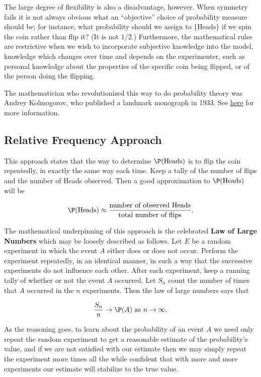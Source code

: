 \documentclass[captions=tableheading]{scrbook}
\begin{document}
The large degree of flexibility is also a disadvantage, however. When symmetry fails it is not always obvious what an ``objective'' choice of probability measure should be; for instance, what probability should we assign to \( \{ \mbox{Heads} \} \) if we spin the coin rather than flip it? (It is not \(1/2\).) Furthermore, the mathematical rules are restrictive when we wish to incorporate subjective knowledge into the model, knowledge which changes over time and depends on the experimenter, such as personal knowledge about the properties of the specific coin being flipped, or of the person doing the flipping.

The mathematician who revolutionized this way to do probability theory was Andrey Kolmogorov, who published a landmark monograph in 1933. See \href{http://www-history.mcs.st-andrews.ac.uk/Mathematicians/Kolmogorov.html}{here} for more information.
\subsection{Relative Frequency Approach}
\label{sec-4-3-2}


This approach states that the way to determine \(\P(\mbox{Heads})\) is to flip the coin repeatedly, in exactly the same way each time. Keep a tally of the number of flips and the number of Heads observed. Then a good approximation to \(\P(\mbox{Heads})\) will be

\begin{equation} 
\P(\mbox{Heads})\approx\frac{\mbox{number of observed Heads}}{\mbox{total number of flips}}.
\end{equation}


The mathematical underpinning of this approach is the celebrated \textbf{Law of Large Numbers} which may be loosely described as follows. Let \(E\) be a random experiment in which the event \(A\) either does or does not occur. Perform the experiment repeatedly, in an identical manner, in such a way that the successive experiments do not influence each other. After each experiment, keep a running tally of whether or not the event \(A\) occurred. Let \(S_{n}\) count the number of times that \(A\) occurred in the \(n\) experiments. Then the law of large numbers says that 

\begin{equation}
\frac{S_{n}}{n}\to\P(A)\mbox{ as }n\to\infty.
\end{equation}


As the reasoning goes, to learn about the probability of an event \(A\) we need only repeat the random experiment to get a reasonable estimate of the probability's value, and if we are not satisfied with our estimate then we may simply repeat the experiment more times all the while confident that with more and more experiments our estimate will stabilize to the true value. 
\end{document}
